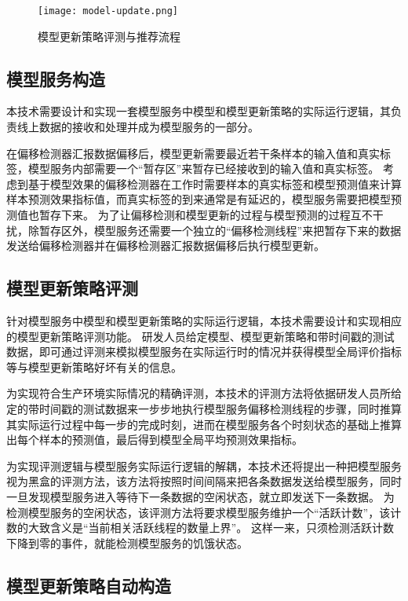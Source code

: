 \begin{figure}
  \centering
  \texttt{[image: model-update.png]}
  \caption{模型更新策略评测与推荐流程}
  \label{fig:modelupdate}
\end{figure}

\subsection{模型服务构造}

本技术需要设计和实现一套模型服务中模型和模型更新策略的实际运行逻辑，其负责线上数据的接收和处理并成为模型服务的一部分。

在偏移检测器汇报数据偏移后，模型更新需要最近若干条样本的输入值和真实标签，模型服务内部需要一个“暂存区”来暂存已经接收到的输入值和真实标签。
考虑到基于模型效果的偏移检测器在工作时需要样本的真实标签和模型预测值来计算样本预测效果指标值，而真实标签的到来通常是有延迟的，模型服务需要把模型预测值也暂存下来。
为了让偏移检测和模型更新的过程与模型预测的过程互不干扰，除暂存区外，模型服务还需要一个独立的“偏移检测线程”来把暂存下来的数据发送给偏移检测器并在偏移检测器汇报数据偏移后执行模型更新。

\subsection{模型更新策略评测}

针对模型服务中模型和模型更新策略的实际运行逻辑，本技术需要设计和实现相应的模型更新策略评测功能。
研发人员给定模型、模型更新策略和带时间戳的测试数据，即可通过评测来模拟模型服务在实际运行时的情况并获得模型全局评价指标等与模型更新策略好坏有关的信息。

为实现符合生产环境实际情况的精确评测，本技术的评测方法将依据研发人员所给定的带时间戳的测试数据来一步步地执行模型服务偏移检测线程的步骤，同时推算其实际运行过程中每一步的完成时刻，进而在模型服务各个时刻状态的基础上推算出每个样本的预测值，最后得到模型全局平均预测效果指标。

为实现评测逻辑与模型服务实际运行逻辑的解耦，本技术还将提出一种把模型服务视为黑盒的评测方法，该方法将按照时间间隔来把各条数据发送给模型服务，同时一旦发现模型服务进入等待下一条数据的空闲状态，就立即发送下一条数据。
为检测模型服务的空闲状态，该评测方法将要求模型服务维护一个“活跃计数”，该计数的大致含义是“当前相关活跃线程的数量上界”。
这样一来，只须检测活跃计数下降到零的事件，就能检测模型服务的饥饿状态。

\subsection{模型更新策略自动构造}

